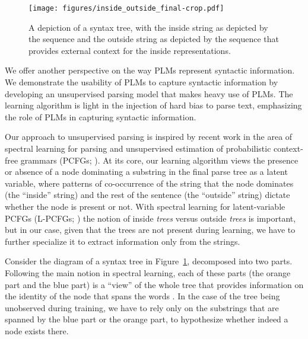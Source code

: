 \documentclass[11pt]{article}
\begin{document}
\begin{figure}[t]
    \centering
     \texttt{[image: figures/inside\_outside\_final-crop.pdf]}
    \caption{A depiction of a syntax tree, with the inside string as depicted by the sequence  and the outside string as depicted by the sequence  that provides external context for the inside representations.}
    \label{fig:io-tree}
\end{figure}


We offer another perspective on the way PLMs represent syntactic information. We demonstrate the usability of PLMs to capture syntactic information by developing an unsupervised parsing model that makes heavy use of PLMs. The learning algorithm is light in the injection of hard bias to parse text, emphasizing the role of PLMs in capturing syntactic information.

Our approach to unsupervised parsing is inspired by recent work in the area of spectral learning for parsing \citep{JMLR:v15:cohen14a, cohen-etal-2013-experiments} and unsupervised estimation of probabilistic context-free grammars (PCFGs; \citealp{clark-fijalkow-2020-consistent}). At its core, our learning algorithm views the presence or absence of a node dominating a substring in the final parse tree as a latent variable, where patterns of co-occurrence of the string that the node dominates (the ``inside'' string) and the rest of the sentence (the ``outside'' string) dictate whether the node is present or not. With spectral learning for latent-variable PCFGs (L-PCFGs; \citealp{JMLR:v15:cohen14a,cohen-collins-2014-provably}) the notion of inside \emph{trees} versus outside \emph{trees} is important, but in our case, given that the trees are not present during learning, we have to further specialize it to extract information only from the strings.

Consider the diagram of a syntax tree in Figure~\ref{fig:io-tree}, decomposed into two parts. Following the main notion in spectral learning, each of these parts (the orange part and the blue part) is a ``view'' of the whole tree that provides information on the identity of the node that spans the words . In the case of the tree being unobserved during training, we have to rely only on the substrings that are spanned by the blue part or the orange part, to hypothesize whether indeed a node exists there.
\end{document}
